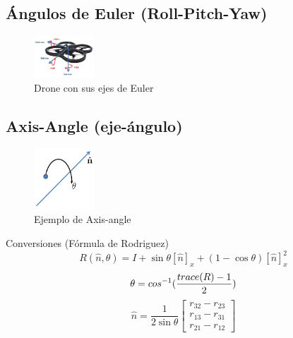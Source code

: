 \documentclass[main.tex]{subfiles}
\begin{document}
\subsection{Ángulos de Euler (Roll-Pitch-Yaw)}
\begin{figure}[h]
  \centering
  \includegraphics[width=0.2\textwidth]{../img/rpy_drone.jpg}
  \caption{Drone con sus ejes de Euler}
  \label{rpy_drone}
\end{figure}

\subsection{Axis-Angle (eje-ángulo)}

\begin{figure}[h]
  \centering
  \includegraphics[width=0.2\textwidth]{../img/axisang.jpg}
  \caption{Ejemplo de Axis-angle}
  \label{axisang}
\end{figure}

Conversiones (Fórmula de Rodriguez)
\begin{equation}
  R(\hat{n},\theta)=I+\sin\theta\left [ \hat{n} \right ]_{x}+(1-\cos\theta)\left [ \hat{n} \right ]_{x}^2
\end{equation}
\begin{equation}
  \theta=\\cos^{-1}(\frac{trace(R)-1}{2})
\end{equation}
\begin{equation}
  \hat{n} = \frac{1}{2\sin\theta}
            \begin{bmatrix}
              r_{32}-r_{23}\\ 
              r_{13}-r_{31}\\ 
              r_{21}-r_{12}
            \end{bmatrix}
\end{equation}
\end{document}
